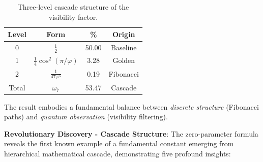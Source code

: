 \documentclass[%
 reprint,
 amsmath,amssymb,
 aps,
 prd,
 10pt,
 nofootinbib,      %
 longbibliography  %
]{revtex4-2}
\theoremstyle{definition}
\theoremstyle{remark}
\begin{document}
\begin{table}[htbp]
  \centering
  \footnotesize
  \begin{tabular}{cccc}
    \toprule
    Level & Form & \% & Origin \\
    \midrule
    0 & $\frac{1}{2}$ & 50.00 & Baseline \\
    1 & $\frac{1}{4}\cos^2(\pi/\varphi)$ & 3.28 & Golden \\
    2 & $\frac{1}{47\varphi^5}$ & 0.19 & Fibonacci \\
    \midrule
    Total & $\omega_7$ & 53.47 & Cascade \\
    \bottomrule
  \end{tabular}
  \caption{Three-level cascade structure of the visibility factor.}
  \label{tab:cascade}
\end{table}

The result embodies a fundamental balance between
\emph{discrete structure} (Fibonacci paths) and
\emph{quantum observation} (visibility filtering).

\textbf{Revolutionary Discovery - Cascade Structure}: The zero-parameter formula reveals the first known example of a fundamental constant emerging from hierarchical mathematical cascade, demonstrating five profound insights:
\end{document}
